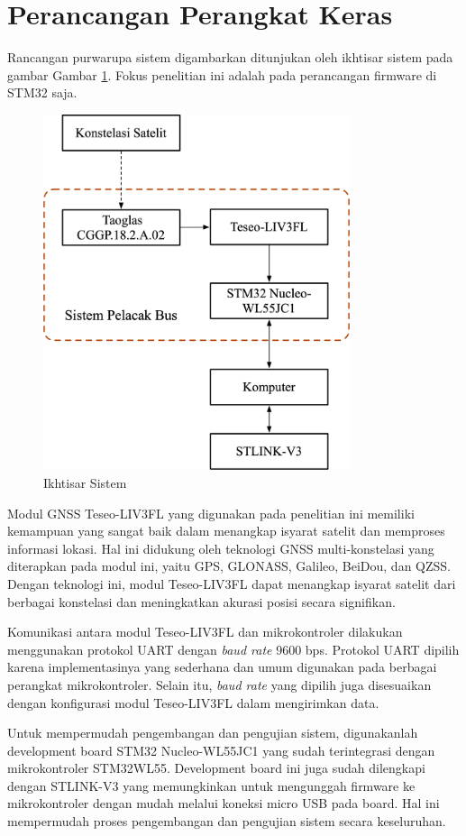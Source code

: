 \section{Perancangan Perangkat Keras}
Rancangan purwarupa sistem digambarkan ditunjukan oleh ikhtisar sistem pada gambar Gambar  \ref{Fig: system-overview}. Fokus penelitian ini adalah pada perancangan firmware di STM32 saja. 

\begin{figure}[H]
	\centering
	\includegraphics[width=9cm]{contents/chapter-3/system-overview.png}
	\caption{Ikhtisar Sistem}
	\label{Fig: system-overview}
\end{figure}

Modul GNSS Teseo-LIV3FL yang digunakan pada penelitian ini memiliki kemampuan yang sangat baik dalam menangkap isyarat satelit dan memproses informasi lokasi. Hal ini didukung oleh teknologi GNSS multi-konstelasi yang diterapkan pada modul ini, yaitu GPS, GLONASS, Galileo, BeiDou, dan QZSS. Dengan teknologi ini, modul Teseo-LIV3FL dapat menangkap isyarat satelit dari berbagai konstelasi dan meningkatkan akurasi posisi secara signifikan.

Komunikasi antara modul Teseo-LIV3FL dan mikrokontroler dilakukan menggunakan protokol UART dengan \textit{baud rate} 9600 bps. Protokol UART dipilih karena implementasinya yang sederhana dan umum digunakan pada berbagai perangkat mikrokontroler. Selain itu, \textit{baud rate} yang dipilih juga disesuaikan dengan konfigurasi modul Teseo-LIV3FL dalam mengirimkan data.

Untuk mempermudah pengembangan dan pengujian sistem, digunakanlah development board STM32 Nucleo-WL55JC1 yang sudah terintegrasi dengan mikrokontroler STM32WL55. Development board ini juga sudah dilengkapi dengan STLINK-V3 yang memungkinkan untuk mengunggah firmware ke mikrokontroler dengan mudah melalui koneksi micro USB pada board. Hal ini mempermudah proses pengembangan dan pengujian sistem secara keseluruhan.

